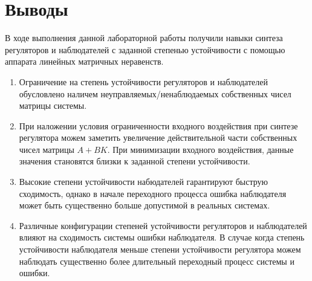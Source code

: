 \section{Выводы}
В ходе выполнения данной лабораторной работы получили навыки синтеза регуляторов и наблюдателей с заданной степенью устойчивости
с помощью аппарата линейных матричных неравенств.
\begin{enumerate}
    \item Ограничение на степень устойчивости регуляторов и наблюдателей обусловлено наличем неуправляемых/ненаблюдаемых
собственных чисел матрицы системы.
    \item При наложении условия ограниченности входного воздействия при синтезе регулятора можем заметить увеличение
действительной части собственных чисел матрицы $A + BK$. При минимизации входного воздействия, данные значения становятся близки к заданной степени устойчивости.
    \item Высокие степени устойчивости набюдателей гарантируют быструю сходимость, однако в начале переходного процесса
ошибка наблюдателя может быть существенно больше допустимой в реальных системах.
    \item Различные конфигурации степеней устойчивости регуляторов и наблюдателей влияют на сходимость системы ошибки наблюдателя. В случае
когда степень устойчивости наблюдателя меньше степени устойчивости регулятора можем наблюдать существенно более длительный переходный процесс системы и ошибки.
\end{enumerate}